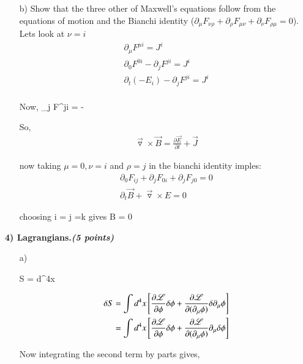 {\begin{itemize}
\item[b)]Show that the three other of Maxwell’s equations follow from the equations of motion and the Bianchi identity ($\partial_\mu F_{\nu\rho} +\partial_\rho F_{\mu\nu} +\partial_\nu F_{\rho\mu} =0$). 
Lets look at $\nu = i$
\begin{align}
\partial_\mu F^{\mu i} = J^i \\
\partial_0 F^{0i} - \partial_j F^{ji} = J^i \\
\partial_t (-E_i) - \partial_j F^{ji} = J^i \\
\end{align}

Now,
\be
\partial_j F^{ji} = - \vec{\triangledown} \times {}
\ee

So, 
\begin{align}
\vec{\triangledown} \times \vec{B} = \frac{\partial \vec{E}}{\partial t}  + \vec{J}
\end{align}


now taking $\mu = 0, \nu = i$ and $\rho = j$ in the bianchi identity imples:
\begin{align*}
\partial_0 F_{ij} + \partial_j F_{0i} + \partial_j F_{j0} = 0\\
\partial_t \vec{B} + \vec{\triangledown} \times E = 0
\end{align*}

choosing i = j =k gives 
\be
\vec{\triangledown} \cdot B = 0
\ee


\end{itemize}

\vspace*{0.25in}

\textbf{4) Lagrangians.\hfill \textit{(5 points)}}
\begin{itemize}
\item[a)]

\be
S = \int d^4x \bigL
\ee

\begin{align*}
\delta S = \int d^4x \left[ \frac{\partial \mathscr{L}}{\partial \phi} {\delta \phi} + \frac{\partial \mathscr{L}}{\partial (\partial_\mu \phi)} {\delta \partial_\mu \phi}  \right]\\
= \int d^4x \left[ \frac{\partial \mathscr{L}}{\partial \phi} {\delta \phi} + \frac{\partial \mathscr{L}}{\partial (\partial_\mu \phi)} {\partial_\mu \delta \phi}  \right]\\
\end{align*}

Now integrating the second term by parts gives,


\end{itemize}}
